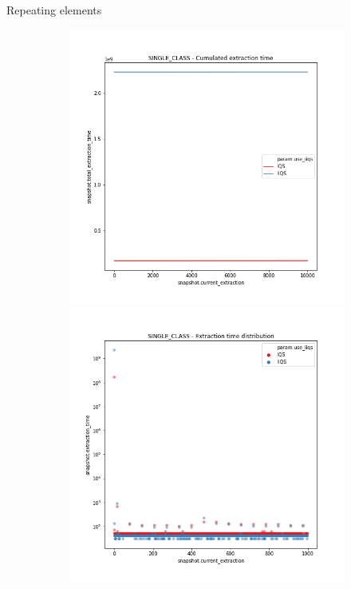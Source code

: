 \documentclass{beamer}
\begin{document}
\begin{frame}{Repeating elements}
    \begin{figure}
        \centering
        \begin{subfigure}[b]{\textwidth}
            \centering
            \includegraphics[height=0.4\textheight]{chapter4/01-basebenchmark-04-single-class.png.0-0.png}
            \includegraphics[height=0.4\textheight]{chapter4/01-basebenchmark-04-single-class.png.1-1.png}

\end{subfigure}
\end{figure}
\end{frame}
\end{document}
